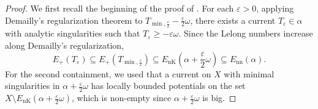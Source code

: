 \documentclass[a4paper]{amsart}
\renewcommand{\epsilon}{\varepsilon}
\newcommand{\nn}{\text{nn}}
\newcommand{\nK}{\text{nK}}
\theoremstyle{definition}
\begin{document}
\begin{proof}
     We first recall the beginning of the proof of \cite[Lemma 5.1]{RestrictedVol}. For each $\epsilon > 0$, applying Demailly's regularization theorem to $T_{\min, \frac{\epsilon}{2}} - \frac{\epsilon}{2}\omega$, there exists a current $T_\epsilon \in \alpha$ with analytic singularities such that $T_\epsilon \ge -\epsilon\omega$. Since the Lelong numbers increase along Demailly's regularization, \[E_+(T_\epsilon) \subseteq E_+(T_{\min, \frac{\epsilon}{2}}) \subseteq E_\nK\left(\alpha + \frac{\epsilon}{2}\omega\right) \subseteq E_\nn(\alpha).\]
    For the second containment, we used that a current on $X$ with minimal singularities in $\alpha + \frac{\epsilon}{2}\omega$ has locally bounded potentials on the set $X \setminus E_\nK\left(\alpha + \frac{\epsilon}{2}\omega\right)$, which is non-empty since $\alpha + \frac{\epsilon}{2}\omega$ is big.


\end{proof}
\end{document}
